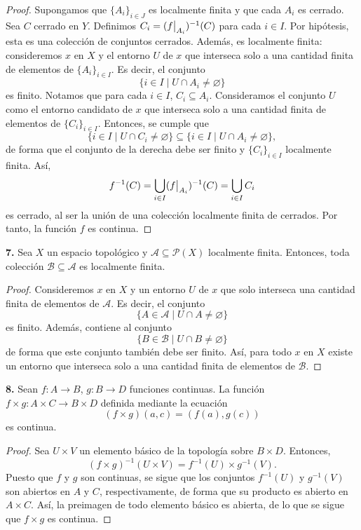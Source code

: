 \documentclass{article}
\newcommand\restr[2]{{%
		\left.\kern-\nulldelimiterspace %
		#1 %
		\vphantom{\big|} %
		\right|_{#2} %
}}
\begin{document}
\begin{proof}
	Supongamos que $\{ A_{i} \}_{i \in J}$ es localmente finita y que cada $A_{i}$ es cerrado. Sea $C$ cerrado en $Y$. Definimos $C_{i} = (\restr{f}{A_{i}})^{-1}(C)$ para cada $i \in I$. Por hipótesis, esta es una colección de conjuntos cerrados. Además, es localmente finita: consideremos $x$ en $X$ y el entorno $U$ de $x$ que interseca solo a una cantidad finita de elementos de $\{A_{i} \}_{i \in I}$. Es decir, el conjunto 
	$$ \{ i \in I \mid U \cap A_{i} \neq \varnothing \} $$
	es finito. Notamos que para cada $i \in I$, $C_{i} \subseteq A_{i}$. Consideramos el conjunto $U$ como el entorno candidato de $x$ que interseca solo a una cantidad finita de elementos de $\{ C_{i} \}_{i \in I}$. Entonces, se cumple que 
	$$\{ i \in I \mid U \cap C_{i} \neq \varnothing \} \subseteq  \{ i \in I \mid U \cap A_{i} \neq \varnothing \},$$
	de forma que el conjunto de la derecha debe ser finito y $\{ C_{i} \}_{i \in I}$ localmente finita. Así, 
	$$f^{-1}(C) = \bigcup_{i \in I} (\restr{f}{A_{i}})^{-1}(C)  = \bigcup_{i \in I} C_{i} $$ 
	es cerrado, al ser la unión de una colección localmente finita de cerrados. Por tanto, la función $f$ es continua.  
\end{proof}

\begin{mybox}
	\textbf{7.} Sea $X$ un espacio topológico y $\mathcal{A} \subseteq \mathcal{P}(X)$ localmente finita. Entonces, toda colección $\mathcal{B} \subseteq \mathcal{A}$ es localmente finita. 
\end{mybox}	
\begin{proof}
	Consideremos $x$ en $X$ y un entorno $U$ de $x$ que solo interseca una cantidad finita de elementos de $\mathcal{A}$. Es decir, el conjunto
	$$ \{ A \in \mathcal{A} \mid U \cap A \neq \varnothing \} $$
	es finito. Además, contiene al conjunto
	$$ \{ B \in \mathcal{B} \mid U \cap B \neq \varnothing \} $$
	de forma que este conjunto también debe ser finito. Así, para todo $x$ en $X$ existe un entorno que interseca solo a una cantidad finita de elementos de $\mathcal{B}$.
\end{proof}

\begin{mybox}
	\textbf{8. } Sean $f: A \rightarrow B$, $g: B \rightarrow D$ funciones continuas. La función $f \times g : A \times C \rightarrow B \times D$ definida mediante la ecuación
	$$ (f \times g)(a, c) = (f(a), g(c)) $$
	es continua. 
\end{mybox}	
\begin{proof}
	Sea $U \times V$ un elemento básico de la topología sobre $B \times D$. Entonces, 
	$$ (f \times g)^{-1}(U \times V) = f^{-1}(U) \times g^{-1}(V) .$$
	Puesto que $f$ y $g$ son continuas, se sigue que los conjuntos  $f^{-1}(U)$ y $ g^{-1}(V)$ son abiertos en $A$ y $C$, respectivamente, de forma que su producto es abierto en $A \times C$.  Así, la preimagen de todo elemento básico es abierta, de lo que se sigue que $f \times g$ es continua. 
\end{proof}
\end{document}
